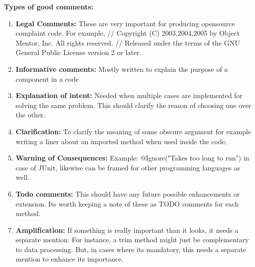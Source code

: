 \documentclass[12pt]{article}
\begin{document}
\textbf{Types of good comments:}
\begin{enumerate}
    \item \textbf{Legal Comments:} These are very important for producing opensource complaint code. For example, \newline
    // Copyright (C) 2003,2004,2005 by Object Mentor, Inc. All rights reserved.\newline
    // Released under the terms of the GNU General Public License version 2 or later.
    \item \textbf{Informative comments: }Mostly written to explain the purpose of a component in a code
    \item \textbf{Explanation of intent: }Needed when multiple cases are implemented for solving the same problem. This should clarify the reason of choosing one over the other.
    \item \textbf{Clarification: }To clarify the meaning of some obscure argument for example writing a liner about an imported method when used inside the code.
    \item \textbf{Warning of Consequences: }Example: @Ignore("Takes too long to run") in case of JUnit, likewise can be framed for other programming languages as well.
    \item \textbf{Todo comments: }This should have any future possible enhancements or extension. Its worth keeping a note of these as TODO comments for each method.
    \item \textbf{Amplification: }If something is really important than it looks, it needs a separate mention. For instance, a trim method might just be complementary to data processing. But, in cases where its mandatory, this needs a separate mention to enhance its importance.
\end{enumerate}
\end{document}
